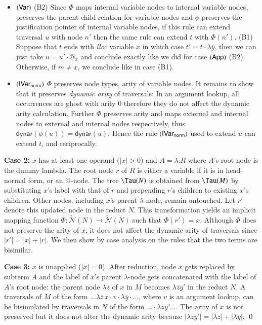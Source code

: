 \documentclass{elsarticle}
\def\endproofatend{\end{proof}}
\theoremstyle{plain}
\theoremstyle{definition}
\newcommand\Nodes{\mathcal{N}}%
\newcommand\ExtendedNodes{\tilde{\Nodes}}
\newcommand{\normalizing}{{\sf norm}}
\newcommand{\ctree}{\Tau} %
\newcommand\dynar{\textsf{dynar}} %
\begin{document}
\begin{itemize}[itemindent=0.1em, leftmargin=0.4em]
    \item $\mathbf{({\sf Var})}$
    (B2) Since $\Phi$ maps internal variable nodes to internal
    variable nodes, preserves the parent-child relation for variable nodes and $\phi$ preserves the justification pointer of internal variable nodes, if this rule can extend traversal $u$ with node $n'$ then the same rule can extend $t$ with $\Phi(n')$.
%
    (B1) Suppose that $t$ ends with \emph{lloc} variable $x$ in which case $t' = t \cdot \lambda\overline{y}$, then
        we can just take $u = u' \cdot @_x$ and conclude exactly like we did for case $\mathbf{({\sf App})}$ (B2).
    Otherwise, if $m\neq x$, we conclude like in case (B1).

    \item $\rulename{IVar_\normalizing}$ $\Phi$ preserves node types, arity of variable nodes. It remains to show that it preserves \emph{dynamic arity} of traversals: In an argument lookup, all occurrences are ghost with arity $0$ therefore they do not affect the dynamic arity calculation.
    Further $\Phi$ preserves arity and maps external and internal nodes to external and internal nodes respectively, thus $\dynar(\phi(u))=\dynar(u)$.
    Hence the rule $\rulename{IVar_\normalizing}$ used to extend $u$ can extend $t$, and reciprocally.
\end{itemize}

{\bf Case 2:} $x$ has at least one operand ($|x|>0$) and $A = \lambda. R$ where $A$'s root node is the dummy lambda.
The root node $r$ of $R$ is either a variable if it is in head-normal form, or an $@$-node.
The tree $\ctree(N)$ is obtained from $\ctree(M)$
by substituting $x$'s label with that of $r$ and prepending $r$'s children to existing $x$'s children. Other nodes, including $x$'s parent $\lambda$-node, remain untouched. Let $r'$ denote this updated node in the reduct $N$.
This transformation yields an implicit mapping function $\Phi : \ExtendedNodes(N)\rightarrow \ExtendedNodes(N)$ such that $\Phi(r') = x$.
Although $\Phi$ does not preserve the arity of $x$, it does not affect the dynamic arity of traversals since $|r'| = |x| + |r|$.
We then show by case analysis on the rules that the two terms are bisimilar.

{\bf Case 3:} $x$ is unapplied ($|x|=0$).
%
After reduction, node $x$ gets replaced by subterm $A$ and the label of $x$'s parent $\lambda$-node gets concatenated with the label of $A$'s root node:
the parent node $\lambda\overline{z}$ of $x$ in $M$ becomes $\lambda\overline{z}\overline{y}'$ in the reduct $N$.
A traversals of $M$ of the form $\ldots \lambda\overline{z} \, x \cdot v \cdot \lambda\overline{y} \cdot \ldots$, where $v$ is an argument lookup, can be bisimulated by traversals in $N$ of the form $\ldots \cdot \lambda\overline{z}\overline{y}' \ldots$. The arity of $x$ is not preserved but it does not alter the dynamic arity because $|\lambda{\overline{z} \overline{y}'}| =
 |\lambda{\overline{z}}| +  |\lambda{\overline{y}}|$.
\qed
\end{document}
